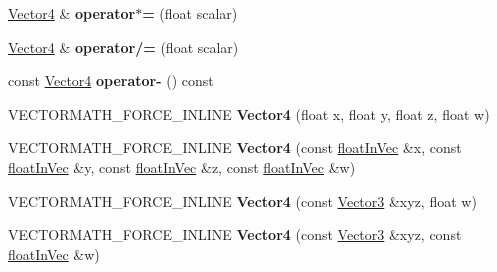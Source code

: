\begin{DoxyCompactItemize}
\hyperlink{classVectormath_1_1Aos_1_1Vector4}{Vector4} \& {\bfseries operator$\ast$=} (float scalar)
\item 
\mbox{\label{classVectormath_1_1Aos_1_1Vector4_a828cc75c1e71ecde819225ad1a8d5d7f}} 
\hyperlink{classVectormath_1_1Aos_1_1Vector4}{Vector4} \& {\bfseries operator/=} (float scalar)
\item 
\mbox{\label{classVectormath_1_1Aos_1_1Vector4_a71fbcef459b9a5871ac0e40c94d362fc}} 
const \hyperlink{classVectormath_1_1Aos_1_1Vector4}{Vector4} {\bfseries operator-\/} () const
\item 
\mbox{\label{classVectormath_1_1Aos_1_1Vector4_a3a4501d24f6f6c97af5ed98b457215e2}} 
V\+E\+C\+T\+O\+R\+M\+A\+T\+H\+\_\+\+F\+O\+R\+C\+E\+\_\+\+I\+N\+L\+I\+NE {\bfseries Vector4} (float x, float y, float z, float w)
\item 
\mbox{\label{classVectormath_1_1Aos_1_1Vector4_ac78e78499f3fb8b5dd65d33c82ecff30}} 
V\+E\+C\+T\+O\+R\+M\+A\+T\+H\+\_\+\+F\+O\+R\+C\+E\+\_\+\+I\+N\+L\+I\+NE {\bfseries Vector4} (const \hyperlink{classVectormath_1_1floatInVec}{float\+In\+Vec} \&x, const \hyperlink{classVectormath_1_1floatInVec}{float\+In\+Vec} \&y, const \hyperlink{classVectormath_1_1floatInVec}{float\+In\+Vec} \&z, const \hyperlink{classVectormath_1_1floatInVec}{float\+In\+Vec} \&w)
\item 
\mbox{\label{classVectormath_1_1Aos_1_1Vector4_aa01a20cca631ed841fa5e7dc054d3a3b}} 
V\+E\+C\+T\+O\+R\+M\+A\+T\+H\+\_\+\+F\+O\+R\+C\+E\+\_\+\+I\+N\+L\+I\+NE {\bfseries Vector4} (const \hyperlink{classVectormath_1_1Aos_1_1Vector3}{Vector3} \&xyz, float w)
\item 
\mbox{\label{classVectormath_1_1Aos_1_1Vector4_a63194e4609276a4b76f67a6c33668e4d}} 
V\+E\+C\+T\+O\+R\+M\+A\+T\+H\+\_\+\+F\+O\+R\+C\+E\+\_\+\+I\+N\+L\+I\+NE {\bfseries Vector4} (const \hyperlink{classVectormath_1_1Aos_1_1Vector3}{Vector3} \&xyz, const \hyperlink{classVectormath_1_1floatInVec}{float\+In\+Vec} \&w)
\item 
\mbox{\label{classVectormath_1_1Aos_1_1Vector4_a6294264878da234130bc0e7b932c5d6a}} 

\end{DoxyCompactItemize}
